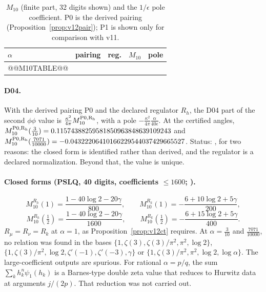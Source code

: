 \begin{center}
\small
\begin{longtable}{@{}lllll@{}}
\caption{\(M_{10}\) (finite part, 32 digits shown) and the \(1/\epsilon\) pole coefficient. P0 is the derived pairing (Proposition~\ref{prop:v12pair}); P1 is shown only for comparison with v11.}\label{tab:v12M10}\\
\toprule
\(\alpha\) & pairing & reg. & \(M_{10}\) & pole\\
\midrule
@@M10TABLE@@
\bottomrule
\end{longtable}
\end{center}

\paragraph{D04.} With the derived pairing P0 and the declared
regulator \(R_h\), the D04 part of the second \(\phi\phi\) value is
\(\tfrac{\kappa^2}{4\pi}M_{10}^{\rm P0,R_h}\), with a pole
\(-\tfrac{\kappa^2}{4\pi}\tfrac{\alpha}{40\epsilon}\). At the
certified angles,
\(M_{10}^{\rm P0,R_h}(\tfrac3{10})=0.11574388259581850963848639109243\)
and
\(M_{10}^{\rm P0,R_h}(\tfrac{7071}{10000})=-0.04322206410166229544037429665527\).
Status: \PARTIAL, for two reasons: the closed form is identified
rather than derived, and the regulator is a declared normalization.
Beyond that, the value is unique.

\paragraph{Closed forms (PSLQ, 40 digits, coefficients \(\le1600\);
).}
\[
M_{10}^{R_h}(1)=\frac{1-40\log2-20\gamma}{800},\qquad
M_{10}^{R_k}(1)=-\frac{6+10\log2+5\gamma}{200},
\]
\[
M_{10}^{R_h}(\tfrac12)=\frac{1-40\log2-20\gamma}{1600},\qquad
M_{10}^{R_k}(\tfrac12)=-\frac{6+15\log2+5\gamma}{400}.
\]
\(R_\mu=R_\nu=R_k\) at \(\alpha=1\), as Proposition~\ref{prop:v12ct}
requires. At \(\alpha=\tfrac3{10}\) and \(\tfrac{7071}{10000}\), no
relation was found in the bases \(\{1,\zeta(3),\zeta(3)/\pi^2,\pi^2,\log2\}\),
\(\{1,\zeta(3)/\pi^2,\log2,\zeta'(-1),\zeta'(-3),\gamma\}\) or
\(\{1,\zeta(3)/\pi^2,\pi^2,\log2,\log\alpha\}\). The large-coefficient
outputs are spurious. For rational \(\alpha=p/q\), the sum
\(\sum_kh_k^n\psi_1(h_k)\) is a Barnes-type double zeta value that
reduces to Hurwitz data at arguments \(j/(2p)\). That reduction was
not carried out.

